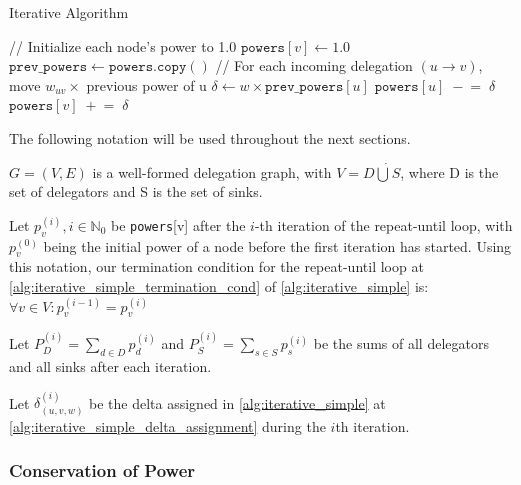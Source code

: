 \begin{algorithm} [H]
 \caption{Iterative Algorithm}\label{alg:iterative_simple}
\begin{algorithmic}[1]
\State // Initialize each node’s power to 1.0  
    \State \(\texttt{powers}[v] \gets 1.0\)
\EndFor
\Repeat
    \State \(\texttt{prev\_powers} \gets \texttt{powers}.\texttt{copy}()\)  
        \State // For each incoming delegation \((u \to v)\), move \(w_{uv}\times\) previous power of u
            \State \(\delta \gets w \times \texttt{prev\_powers}[u]\) \label{alg:iterative_simple_delta_assignment}
            \State \(\texttt{powers}[u] \;-\!=\; \delta\) \label{alg:iterative_simple_remove_delta}
            \State \(\texttt{powers}[v] \;+\!=\; \delta\) \label{alg:iterative_simple_add_delta}
        \EndFor
    \EndFor
{} \label{alg:iterative_simple_termination_cond}
\end{algorithmic}
\end{algorithm}

The following notation will be used throughout the next sections.

$G = (V, E)$ is a well-formed delegation graph, with $V = D \dot\bigcup S$, where D is the set of delegators and S is the set of sinks.

Let $p_v^{(i)}, i \in \mathbb{N}_0$ be \texttt{powers}[v] after the $i$-th iteration of the repeat-until loop, with $p_v^{(0)}$ being the initial power of a node before the first iteration has started. Using this notation, our termination condition for the repeat-until loop at \cref{alg:iterative_simple_termination_cond} of \cref{alg:iterative_simple} is: $\forall v \in V: p_v^{(i-1)} = p_v^{(i)}$

Let $P_D^{(i)} = \sum_{d \in D} p_d^{(i)}$ and $P_S^{(i)} = \sum_{s \in S} p_s^{(i)}$ be the sums of all delegators and all sinks after each iteration.

Let $\delta_{(u, v, w)}^{(i)}$ be the delta assigned in \cref{alg:iterative_simple} at \cref{alg:iterative_simple_delta_assignment} during the $i$th iteration.

\subsubsection{Conservation of Power}


